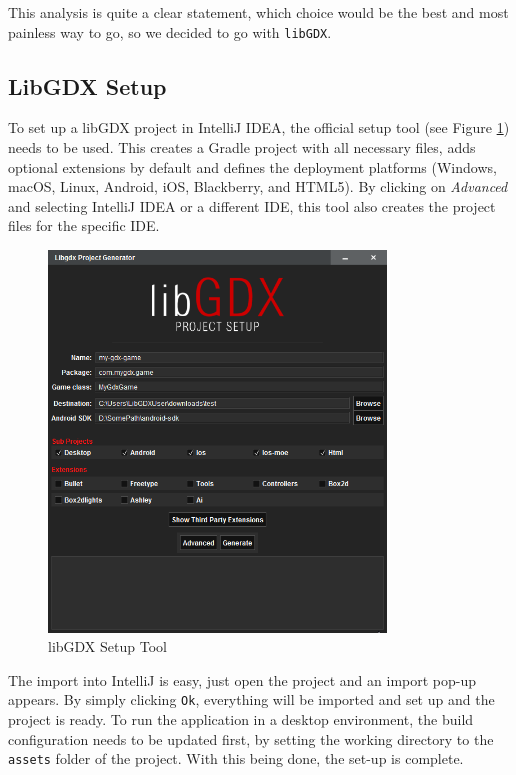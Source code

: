 \documentclass[12p]{article}
\begin{document}
This analysis is quite a clear statement, which choice would be the best and most painless way to go, so we decided to go with \texttt{libGDX}.


\newpage
\subsection{LibGDX Setup} \label{DocSetup}

To set up a libGDX project in IntelliJ IDEA, the official setup tool (see Figure \ref{fig:LibGDXSetupScreenshot}) needs to be used. This creates a Gradle project with all necessary files, adds optional extensions by default and defines the deployment platforms (Windows, macOS, Linux, Android, iOS, Blackberry, and HTML5). By clicking on \emph{Advanced} and selecting IntelliJ IDEA or a different IDE, this tool also creates the project files for the specific IDE.

\begin{figure}[ht]
  \centering
  \includegraphics[width=0.8\textwidth]{libGDX_setup.png}
  \caption{libGDX Setup Tool}
  \label{fig:LibGDXSetupScreenshot}
\end{figure}

The import into IntelliJ is easy, just open the project and an import pop-up appears. By simply clicking \texttt{Ok}, everything will be imported and set up and the project is ready. To run the application in a desktop environment, the build configuration needs to be updated first, by setting the working directory to the \texttt{assets} folder of the project. With this being done, the set-up is complete.
\end{document}

